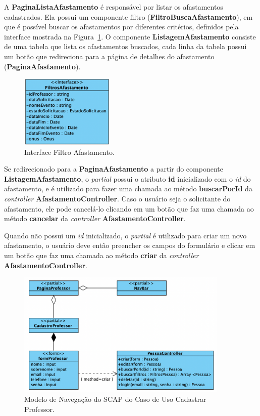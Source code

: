 A \textbf{PaginaListaAfastamento} é responsável por listar os afastamentos cadastrados.
Ela possui um componente filtro (\textbf{FiltroBuscaAfastamento}), em que é possível buscar
os afastamentos por diferentes critérios, definidos pela interface mostrada na Figura~\ref{fig-interface-filtro-afast}.
O componente \textbf{ListagemAfastamento} consiste de uma tabela que lista os afastamentos buscados,
cada linha da tabela possui um botão que redireciona para a página de detalhes do afastamento (\textbf{PaginaAfastamento}).

\begin{figure}
    \centering
    \includegraphics[width=0.4\textwidth]{figuras/fig-interface-filtro-afast.png}
    \caption{Interface Filtro Afastamento.}
    \label{fig-interface-filtro-afast}
\end{figure}

Se redirecionado para a \textbf{PaginaAfastamento} a partir do componente \textbf{ListagemAfastamento},
o \textit{partial} possui o atributo \textbf{id} inicializado com o \textit{id} do afastamento, e é
utilizado para fazer uma chamada ao método \textbf{buscarPorId} da \textit{controller} \textbf{AfastamentoController}.
Caso o usuário seja o solicitante do afastamento, ele pode cancelá-lo clicando em um botão que faz uma chamada ao método
\textbf{cancelar} da \textit{controller} \textbf{AfastamentoController}.

Quando não possui um \textit{id} inicializado, o \textit{partial} é utilizado para criar um novo afastamento,
o usuário deve então preencher os campos do formulário e clicar em um botão que faz uma chamada ao método
\textbf{criar} da \textit{controller} \textbf{AfastamentoController}.


\begin{figure}
    \centering
    \includegraphics[width=0.9\textwidth]{figuras/fig-modelo-naveg-cadast.png}
    \caption{Modelo de Navegação do SCAP do Caso de Uso Cadastrar Professor.}
    \label{fig-modelo-navegacao-professor}
\end{figure}

